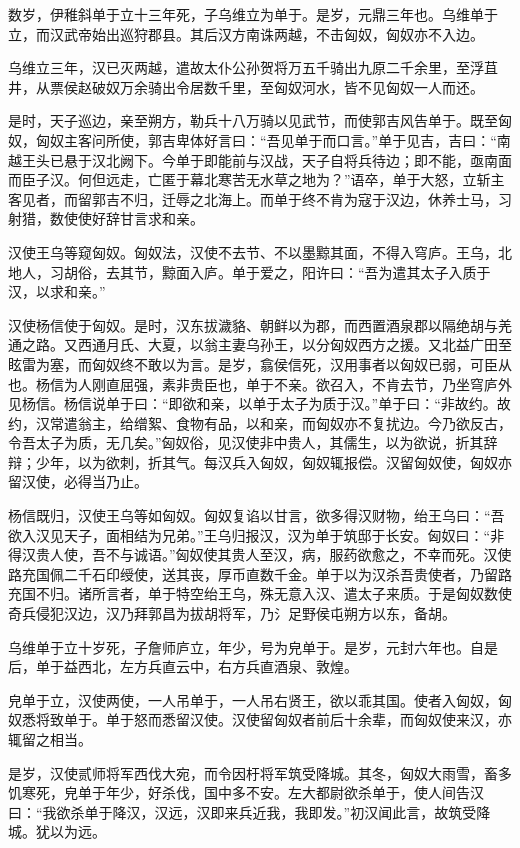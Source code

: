 \documentclass[]{article}
\begin{document}
数岁，伊稚斜单于立十三年死，子乌维立为单于。是岁，元鼎三年也。乌维单于立，而汉武帝始出巡狩郡县。其后汉方南诛两越，不击匈奴，匈奴亦不入边。

乌维立三年，汉已灭两越，遣故太仆公孙贺将万五千骑出九原二千余里，至浮苴井，从票侯赵破奴万余骑出令居数千里，至匈奴河水，皆不见匈奴一人而还。

是时，天子巡边，亲至朔方，勒兵十八万骑以见武节，而使郭吉风告单于。既至匈奴，匈奴主客问所使，郭吉卑体好言曰：``吾见单于而口言。''单于见吉，吉曰：``南越王头已悬于汉北阙下。今单于即能前与汉战，天子自将兵待边；即不能，亟南面而臣子汉。何但远走，亡匿于幕北寒苦无水草之地为？''语卒，单于大怒，立斩主客见者，而留郭吉不归，迁辱之北海上。而单于终不肯为寇于汉边，休养士马，习射猎，数使使好辞甘言求和亲。

汉使王乌等窥匈奴。匈奴法，汉使不去节、不以墨黥其面，不得入穹庐。王乌，北地人，习胡俗，去其节，黥面入庐。单于爱之，阳许曰：``吾为遣其太子入质于汉，以求和亲。''

汉使杨信使于匈奴。是时，汉东拔濊貉、朝鲜以为郡，而西置酒泉郡以隔绝胡与羌通之路。又西通月氏、大夏，以翁主妻乌孙王，以分匈奴西方之援。又北益广田至眩雷为塞，而匈奴终不敢以为言。是岁，翕侯信死，汉用事者以匈奴已弱，可臣从也。杨信为人刚直屈强，素非贵臣也，单于不亲。欲召入，不肯去节，乃坐穹庐外见杨信。杨信说单于曰：``即欲和亲，以单于太子为质于汉。''单于曰：``非故约。故约，汉常遣翁主，给缯絮、食物有品，以和亲，而匈奴亦不复扰边。今乃欲反古，令吾太子为质，无几矣。''匈奴俗，见汉使非中贵人，其儒生，以为欲说，折其辞辩；少年，以为欲刺，折其气。每汉兵入匈奴，匈奴辄报偿。汉留匈奴使，匈奴亦留汉使，必得当乃止。

杨信既归，汉使王乌等如匈奴。匈奴复谄以甘言，欲多得汉财物，绐王乌曰：``吾欲入汉见天子，面相结为兄弟。''王乌归报汉，汉为单于筑邸于长安。匈奴曰：``非得汉贵人使，吾不与诚语。''匈奴使其贵人至汉，病，服药欲愈之，不幸而死。汉使路充国佩二千石印绶使，送其丧，厚币直数千金。单于以为汉杀吾贵使者，乃留路充国不归。诸所言者，单于特空绐王乌，殊无意入汉、遣太子来质。于是匈奴数使奇兵侵犯汉边，汉乃拜郭昌为拔胡将军，乃氵足野侯屯朔方以东，备胡。

乌维单于立十岁死，子詹师庐立，年少，号为皃单于。是岁，元封六年也。自是后，单于益西北，左方兵直云中，右方兵直酒泉、敦煌。

皃单于立，汉使两使，一人吊单于，一人吊右贤王，欲以乖其国。使者入匈奴，匈奴悉将致单于。单于怒而悉留汉使。汉使留匈奴者前后十余辈，而匈奴使来汉，亦辄留之相当。

是岁，汉使贰师将军西伐大宛，而令因杅将军筑受降城。其冬，匈奴大雨雪，畜多饥寒死，皃单于年少，好杀伐，国中多不安。左大都尉欲杀单于，使人间告汉曰：``我欲杀单于降汉，汉远，汉即来兵近我，我即发。''初汉闻此言，故筑受降城。犹以为远。
\end{document}
